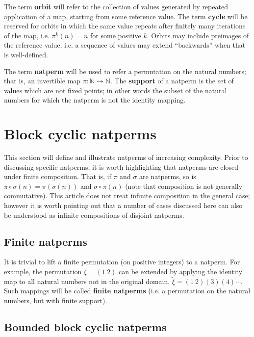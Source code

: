 \documentclass[12pt,reqno]{article}
\begin{document}
The term \textbf{orbit} will refer to the collection of values generated by repeated application of a map, starting from some reference value. The term \textbf{cycle} will be reserved for orbits in which the same value repeats after finitely many iterations of the map, i.e. $\pi^k(n) = n$ for some positive $k$. Orbits may include preimages of the reference value, i.e. a sequence of values may extend ``backwards'' when that is well-defined. 

The term \textbf{natperm} will be used to refer a permutation on the natural numbers; that is, an invertible map $\pi: \mathbb{N} \rightarrow \mathbb{N}$. The \textbf{support} of a natperm is the set of values which are not fixed points; in other words the subset of the natural numbers for which the natperm is not the identity mapping. 

\section{Block cyclic natperms}

This section will define and illustrate natperms of increasing complexity. Prior to discussing specific natperms, it is worth highlighting that natperms are closed under finite composition. That is, if $\pi$ and $\sigma$ are natperms, so is $\pi \circ \sigma(n) = \pi(\sigma(n))$ and $\sigma \circ \pi(n)$ (note that composition is not generally commutative). This article does not treat infinite composition in the general case; however it is worth pointing out that a number of cases discussed here can also be understood as infinite compositions of disjoint natperms.

\subsection{Finite natperms}

It is trivial to lift a finite permutation (on positive integers) to a natperm. For example, the permutation $\xi = (1 \ 2)$ can be extended by applying the identity map to all natural numbers not in the original domain, $\tilde{\xi} = (1 \ 2)(3)(4)\cdots$. Such mappings will be called \textbf{finite natperms} (i.e. a permutation on the natural numbers, but with finite support).

\subsection{Bounded block cyclic natperms}
\end{document}
